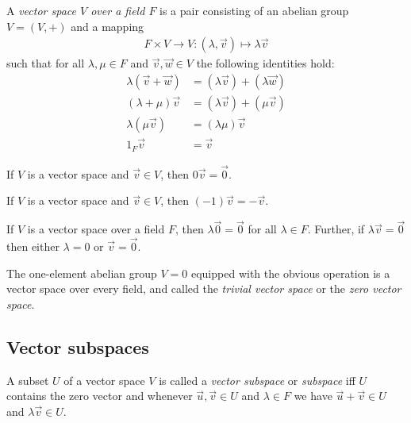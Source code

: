\documentclass{article}
\begin{document}
\begin{definition}
	A \emph{vector space $V$ over a field $F$} is a pair consisting of an abelian
	group $V=(V,+)$ and a mapping
	\begin{align*}
		F\times V\to V:(\lambda,\vec v) \mapsto \lambda \vec v
	\end{align*}
	such that for all $\lambda,\mu\in F$ and $\vec v,\vec w\in V$ the following
	identities hold:
	\begin{align*}
		\lambda(\vec v + \vec w) & = (\lambda\vec v) + (\lambda \vec w) \\
		(\lambda +\mu)\vec v     & = (\lambda\vec v) + (\mu \vec v)     \\
		\lambda(\mu\vec v)       & = (\lambda\mu)\vec v                 \\
		1_F \vec v               & = \vec v
	\end{align*}
\end{definition}

\begin{lemma}[Lemma 1.2.2]
	If $V$ is a vector space and $\vec v\in V$, then $0\vec v =\vec 0$.
\end{lemma}

\begin{lemma}[Lemma 1.2.3]
	If $V$ is a vector space and $\vec v\in V$, then $(-1)\vec v = -\vec v$.
\end{lemma}

\begin{lemma}[Lemma 1.2.4]
	If $V$ is a vector space over a field $F$, then $\lambda\vec 0=\vec 0$
	for all $\lambda\in F$. Further, if $\lambda\vec v=\vec 0$ then either
	$\lambda =0$ or $\vec v =\vec 0$.
\end{lemma}

\begin{definition}
	The one-element abelian group $V=0$ equipped with the
	obvious operation is a vector space over every field, and called the
	\emph{trivial vector space} or the \emph{zero vector space}.
\end{definition}

\subsection{Vector subspaces}

\begin{definition}
	A subset $U$ of a vector space $V$ is called a \emph{vector subspace} or
	\emph{subspace} iff $U$ contains the zero vector and whenever $\vec u,\vec v\in U$
	and $\lambda\in F$ we have $\vec u + \vec v\in U$ and $\lambda\vec v\in U$.
\end{definition}
\end{document}
